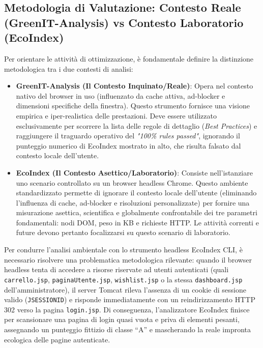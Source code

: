 \subsection{Metodologia di Valutazione: Contesto Reale (GreenIT-Analysis) vs Contesto Laboratorio (EcoIndex)}

Per orientare le attività di ottimizzazione, è fondamentale definire la distinzione metodologica tra i due contesti di analisi:
\begin{itemize}
    \item \textbf{GreenIT-Analysis (Il Contesto Inquinato/Reale)}: Opera nel contesto nativo del browser in uso (influenzato da cache attiva, ad-blocker e dimensioni specifiche della finestra). Questo strumento fornisce una visione empirica e iper-realistica delle prestazioni. Deve essere utilizzato esclusivamente per scorrere la lista delle regole di dettaglio (\textit{Best Practices}) e raggiungere il traguardo operativo del \textit{"100\% rules passed"}, ignorando il punteggio numerico di EcoIndex mostrato in alto, che risulta falsato dal contesto locale dell'utente.
    \item \textbf{EcoIndex (Il Contesto Asettico/Laboratorio)}: Consiste nell'istanziare uno scenario controllato su un browser headless Chrome. Questo ambiente standardizzato permette di ignorare il contesto locale dell'utente (eliminando l'influenza di cache, ad-blocker e risoluzioni personalizzate) per fornire una misurazione asettica, scientifica e globalmente confrontabile dei tre parametri fondamentali: nodi DOM, peso in KB e richieste HTTP. Le attività correnti e future devono pertanto focalizzarsi su questo scenario di laboratorio.
\end{itemize}

Per condurre l'analisi ambientale con lo strumento headless EcoIndex CLI, è necessario risolvere una problematica metodologica rilevante: quando il browser headless tenta di accedere a risorse riservate ad utenti autenticati (quali \texttt{carrello.jsp}, \texttt{paginaUtente.jsp}, \texttt{wishlist.jsp} o la stessa \texttt{dashboard.jsp} dell'amministratore), il server Tomcat rileva l'assenza di un cookie di sessione valido (\texttt{JSESSIONID}) e risponde immediatamente con un reindirizzamento HTTP 302 verso la pagina \texttt{login.jsp}. Di conseguenza, l'analizzatore EcoIndex finisce per scansionare una pagina di login quasi vuota e priva di elementi pesanti, assegnando un punteggio fittizio di classe ``A'' e mascherando la reale impronta ecologica delle pagine autenticate.


